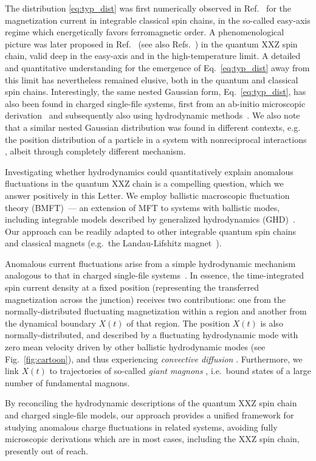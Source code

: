 \documentclass[
twocolumn,
amsfonts,
showpacs,
superscriptaddress,
amsmath,
amssymb,
aps,
longbibliography,
prl,
noeprint
]{revtex4-2}
\newcommand{\ch}[1]{{\color{black}  #1}}
\newcounter{ls}
\newcommand{\1}{{\bf 1}}
\begin{document}
\ch{The distribution \eqref{eq:typ_dist} was first numerically observed in Ref.~\cite{Krajnik2022_1} for the magnetization current in integrable classical spin chains, in the so-called easy-axis regime which energetically favors ferromagnetic order. A phenomenological picture was later proposed in Ref.~\cite{SarangKhemani2024} (see also Refs.~\cite{gopalakrishnan2024nongaussian,Kormos2022}) in the quantum XXZ spin chain, valid deep in the easy-axis and in the high-temperature limit. A detailed and quantitative understanding for the emergence of Eq.~\eqref{eq:typ_dist} away from this limit has nevertheless remained elusive, both in the quantum and classical spin chains.
Interestingly, the same nested Gaussian form, Eq.~\eqref{eq:typ_dist}, has also been found in charged single-file systems, first from an ab-initio microscopic derivation~\cite{Krajnik2022,Krajnik_Schmidt_Pasquier_Prosen_Ilievski_2024,krajnik2024singlefile,krajnik2025} and subsequently also using hydrodynamic methods~\cite{Yoshimura2025,Yoshimura2025_2}. We also note that a similar nested Gaussian distribution was found in different contexts, e.g. the position distribution of a particle in a system with nonreciprocal interactions \cite{Basu2024}, albeit through completely different mechanism.

Investigating whether hydrodynamics could quantitatively explain anomalous fluctuations in the quantum XXZ chain is a compelling question, which we answer positively in  this Letter.
We employ ballistic macroscopic fluctuation theory (BMFT)~\cite{BMFT,Doyon2023longrange,Hubner2025,kethepalli2025,Urilyon2026,mukherjee2026}--- an extension of MFT to systems with ballistic modes, including integrable models described by generalized hydrodynamics (GHD)~\cite{GHD1,GHD2,Bastianello2022,Doyon2025_perspective}. Our approach can be readily adapted to other integrable quantum spin chains~\cite{Ilievski2017} and classical magnets (e.g.~the Landau-Lifshitz magnet~\cite{bastianello2024landaulifschitz}).

Anomalous current fluctuations arise from a simple hydrodynamic mechanism analogous to that in charged single-file systems~\cite{Yoshimura2025}. In essence, the time-integrated spin current density at a fixed position (representing the transferred magnetization across the junction) receives two contributions: one from the normally-distributed fluctuating magnetization within a region and another from the dynamical boundary $X(t)$ of that region. The position $X(t)$ is also normally-distributed, and described by a fluctuating hydrodynamic mode with zero mean velocity driven by other ballistic hydrodynamic modes (see Fig.~\ref{fig:cartoon}), and thus experiencing \emph{convective diffusion} \cite{Medenjak2020}.
Furthermore, we link $X(t)$ to trajectories of so-called {\it giant magnons} \cite{DeNardis2019}, i.e.~bound states of a large number of fundamental magnons.

By reconciling the hydrodynamic descriptions of the quantum XXZ spin chain and charged single-file models, our approach provides a unified framework for studying anomalous charge fluctuations in related systems, avoiding fully microscopic derivations which are in most cases, including the XXZ spin chain, presently out of reach.
}
\end{document}
